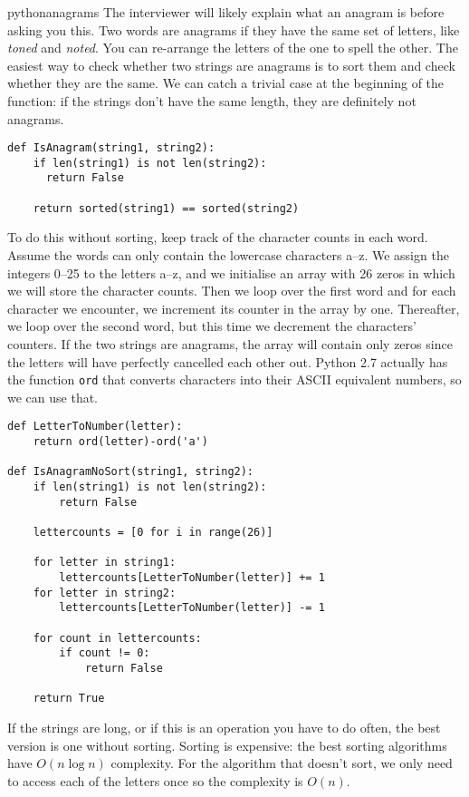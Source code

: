 \begin{answer}{pythonanagrams}
The interviewer will likely explain what an anagram is before asking you this.
Two words are anagrams if they have the same set of letters, like \emph{toned} and \emph{noted}.
You can re-arrange the letters of the one to spell the other.
The easiest way to check whether two strings are anagrams is to sort them and check whether they are the same.
We can catch a trivial case at the beginning of the function: if the strings don't have the same length, they are definitely not anagrams.
\begin{verbatim}
def IsAnagram(string1, string2):
    if len(string1) is not len(string2):
      return False

    return sorted(string1) == sorted(string2)
\end{verbatim}
%
To do this without sorting, keep track of the character counts in each word.
Assume the words can only contain the lowercase characters a--z.
We assign
the integers 0--25
to
the letters a--z, and we initialise an array with 26 zeros in which we will store the character counts.
Then we loop over the first word and for each character we encounter, we increment its counter in the array by one.
Thereafter, we loop over the second word, but this time we decrement the characters' counters.
If the two strings are anagrams, the array will contain only zeros since the letters will have perfectly cancelled each other out.
Python 2.7 actually has the function \verb+ord+ that converts characters into their ASCII equivalent numbers, so we can use that.
\begin{verbatim}
def LetterToNumber(letter):
    return ord(letter)-ord('a')

def IsAnagramNoSort(string1, string2):
    if len(string1) is not len(string2):
        return False

    lettercounts = [0 for i in range(26)]

    for letter in string1:
        lettercounts[LetterToNumber(letter)] += 1
    for letter in string2:
        lettercounts[LetterToNumber(letter)] -= 1

    for count in lettercounts:
        if count != 0:
            return False

    return True
\end{verbatim}

If the strings are long, or if this is an operation you have to do often, the best version is one without sorting.
Sorting is expensive: the best sorting algorithms have $O(n\log{n})$ complexity.
For the algorithm that doesn't sort, we only need to access each of the letters once so the complexity is $O(n)$.
\end{answer}
